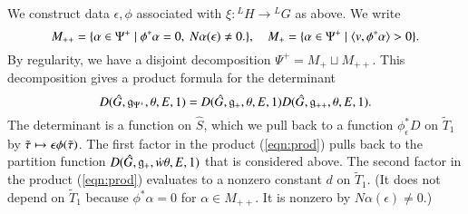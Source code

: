 



We construct data $\epsilon,\phi$ associated with $\xi:{}^LH\to{}^LG$ as above.
We write
\[
M_{++} = \{\alpha\in\Psi^+\mid \phi^*\alpha = 0,\ N\alpha(\epsilon)\ne 0.\},\quad M_+ = \{\alpha\in\Psi^+\mid \langle{v,\phi^*\alpha}\rangle > 0\}.
\]
By regularity, we have a  disjoint decomposition $\Psi^+ = M_+ \sqcup M_{++}$.  This decomposition gives a product formula for the determinant
\begin{equation}\label{eqn:prod}
D(\hat G,{\mathfrak g}_{\Psi^+},\theta,E,1) = D(\hat G,{\mathfrak g}_{+},\theta,E,1) D(\hat G,{\mathfrak g}_{++},\theta,E,1).
\end{equation}
The determinant is a function on $\hat S$, which we pull back to a function $\phi^*_\epsilon D$
on $\tilde T_1$ by
$\tilde\tau\mapsto \epsilon \phi(\tilde\tau)$.  The first factor in the product (\ref{eqn:prod}) pulls back to the
partition function $D(\hat G,{\mathfrak g}_+,\dot w\theta,E,1)$ that is considered above.  The second factor in the product (\ref{eqn:prod}) evaluates to
a nonzero constant $d$ on $\tilde T_1$.  (It does not
depend on $\tilde T_1$ because $\phi^*\alpha = 0$ for $\alpha\in M_{++}$. It is nonzero by $N\alpha(\epsilon)\ne 0$.)

